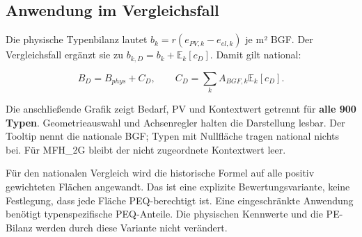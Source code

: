 \documentclass[
  ngerman,
  a4paper,
  DIV=11]{scrreprt}
\begin{document}
\subsection{Anwendung im
Vergleichsfall}\label{anwendung-im-vergleichsfall}

Die physische Typenbilanz lautet \(b_k=r(e_{PV,k}-e_{el,k})\) je m² BGF.
Der Vergleichsfall ergänzt sie zu \(b_{k,D}=b_k+\mathbb E_k[c_D]\).
Damit gilt national:

\[B_D=B_{phys}+C_D,\qquad C_D=\sum_k A_{BGF,k}\mathbb E_k[c_D].\]

Die anschließende Grafik zeigt Bedarf, PV und Kontextwert getrennt für
\textbf{alle 900 Typen}. Geometrieauswahl und Achsenregler halten die
Darstellung lesbar. Der Tooltip nennt die nationale BGF; Typen mit
Nullfläche tragen national nichts bei. Für MFH\_2G bleibt der nicht
zugeordnete Kontextwert leer.

Für den nationalen Vergleich wird die historische Formel auf alle
positiv gewichteten Flächen angewandt. Das ist eine explizite
Bewertungsvariante, keine Festlegung, dass jede Fläche PEQ-berechtigt
ist. Eine eingeschränkte Anwendung benötigt typenspezifische
PEQ-Anteile. Die physischen Kennwerte und die PE-Bilanz werden durch
diese Variante nicht verändert.
\end{document}
